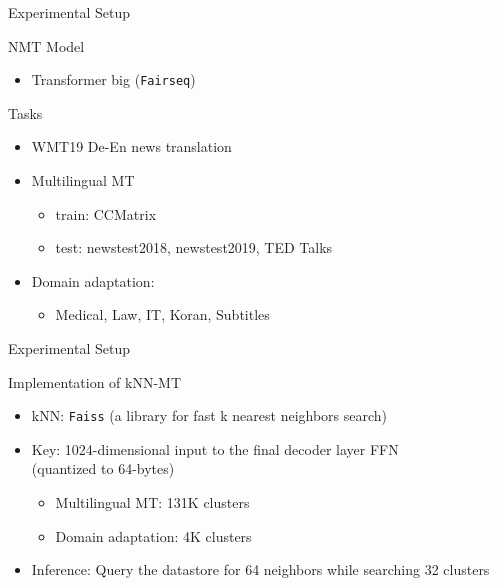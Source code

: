 \documentclass[unicode, 12pt, xdvipdfmx, aspectratio=169]{beamer}
\begin{document}
\begin{frame}[label={sec:org1970d26}]{Experimental Setup}
\begin{block}{NMT Model}
\begin{itemize}
\item Transformer big (\texttt{Fairseq})
\end{itemize}
\end{block}
\begin{block}{Tasks}
\begin{itemize}
\item WMT19 De-En news translation
\item Multilingual MT
\begin{itemize}
\item train: CCMatrix
\item test: newstest2018, newstest2019, TED Talks
\end{itemize}
\item Domain adaptation:
\begin{itemize}
\item Medical, Law, IT, Koran, Subtitles
\end{itemize}
\end{itemize}
\end{block}
\end{frame}

\begin{frame}[label={sec:org275f49f}]{Experimental Setup}
\begin{block}{Implementation of kNN-MT}
\begin{itemize}
\item kNN: \texttt{Faiss} (a library for fast k nearest neighbors search)
\item Key: 1024-dimensional input to the final decoder layer FFN \\ (quantized to 64-bytes)
\begin{itemize}
\item Multilingual MT:  131K clusters
\item Domain adaptation:  4K clusters
\end{itemize}
\item Inference: Query the datastore for 64 neighbors while searching 32 clusters
\end{itemize}
\end{block}
\end{frame}
\end{document}
